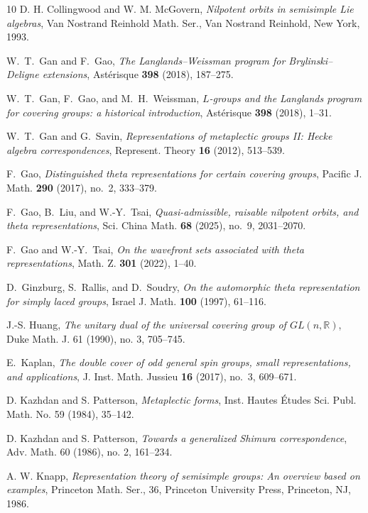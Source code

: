 \documentclass{amsart}
\newcommand{\bbR}{{\mathbb R}}
\theoremstyle{definition}
\begin{document}
\begin{thebibliography}{10}
D. H. Collingwood and W. M. McGovern,
\emph{Nilpotent orbits in semisimple Lie algebras},
Van Nostrand Reinhold Math. Ser.,
Van Nostrand Reinhold, New York, 1993.


W.~T.~Gan and F.~Gao,
\emph{The Langlands--Weissman program for Brylinski--Deligne extensions},
Ast\'erisque \textbf{398} (2018), 187--275.


W.~T.~Gan, F.~Gao, and M.~H.~Weissman,
\emph{\(L\)-groups and the Langlands program for covering groups:
a historical introduction},
Ast\'erisque \textbf{398} (2018), 1--31.


W.~T.~Gan and G.~Savin,
\emph{Representations of metaplectic groups II:
Hecke algebra correspondences},
Represent. Theory \textbf{16} (2012), 513--539.


F.~Gao,
\emph{Distinguished theta representations for certain covering groups},
Pacific J. Math. \textbf{290} (2017), no.~2, 333--379.

F.~Gao, B.~Liu, and W.-Y.~Tsai,
\emph{Quasi-admissible, raisable nilpotent orbits, and theta
representations},
Sci. China Math. \textbf{68} (2025), no.~9, 2031--2070.

F.~Gao and W.-Y.~Tsai,
\emph{On the wavefront sets associated with theta representations},
Math. Z. \textbf{301} (2022), 1--40.



D.~Ginzburg, S.~Rallis, and D.~Soudry,
\emph{On the automorphic theta representation for simply laced groups},
Israel J. Math. \textbf{100} (1997), 61--116.


J.-S. Huang,
\emph{The unitary dual of the universal covering group of \(GL(n,\bbR)\)},
Duke Math. J. 61 (1990), no. 3, 705--745.

E.~Kaplan,
\emph{The double cover of odd general spin groups, small
representations, and applications},
J. Inst. Math. Jussieu \textbf{16} (2017), no.~3, 609--671.

D. Kazhdan and S. Patterson,
\emph{Metaplectic forms},
Inst. Hautes \'Etudes Sci. Publ. Math. No. 59 (1984), 35--142.




D. Kazhdan and S. Patterson,
\emph{Towards a generalized Shimura correspondence},
Adv. Math. 60 (1986), no. 2, 161--234.


A. W. Knapp,
\emph{Representation theory of semisimple groups:
An overview based on examples},
Princeton Math. Ser., 36,
Princeton University Press, Princeton, NJ, 1986.


\end{thebibliography}
\end{document}

